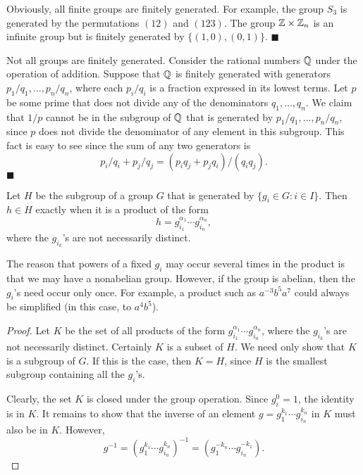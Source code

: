  
\vspace{2ex}
 
 
Obviously, all finite groups are finitely generated. For example, the
group $S_3$ is generated by the permutations $(12)$ and $(123)$. The
group ${\Bbb Z} \times {\Bbb Z}_n$ is an infinite group but is
finitely generated by $\{ (1,0), (0,1) \}$.
\hspace{\fill} $\blacksquare$
 
 
\vspace{2ex}
 
 
Not all groups are finitely generated.  Consider the rational numbers
${\Bbb Q}$ under the operation of addition. Suppose that ${\Bbb Q}$ is
finitely generated with generators $p_1/q_1, \ldots, p_n/q_n$, where
each $p_i/q_i$ is a fraction expressed in its lowest terms.  Let $p$
be some prime that does not divide any of the denominators $q_1,
\ldots, q_n$. We claim that $1/p$ cannot be in the subgroup of ${\Bbb
Q}$ that is generated by  $p_1/q_1, \ldots, p_n/q_n$, since $p$ does
not divide the denominator of any element in this subgroup. This fact
is easy to see since the sum of any two generators is
\[
p_i / q_i + p_j / q_j = (p_i q_j + p_j q_i)/(q_i q_j).
\]
\hspace{\fill} $\blacksquare$
 
 
\begin{theorem}
Let $H$ be the subgroup of a group $G$ that is generated by $\{ g_i
\in G : i \in I \}$. Then $h \in H$ exactly when it is a product of
the form 
\[
h = g_{i_1}^{\alpha_1} \cdots g_{i_n}^{\alpha_n},
\]
where the $g_{i_k}$'s are not necessarily distinct.
\end{theorem}
 
 
The reason that powers of a fixed $g_i$ may occur several times in the
product is that we may have a nonabelian group. However, if the group
is abelian, then the $g_i$'s need occur only once. For example, a
product such as $a^{-3} b^5 a^7$ could always be simplified (in this
case, to $a^4 b^5$). 
 
 
\vspace{2ex}
 
 
\begin{proof}
Let $K$ be the set of all products of the form $g_{i_1}^{\alpha_1}
\cdots g_{i_n}^{\alpha_n}$, where the $g_{i_k}$'s are not necessarily
distinct. Certainly $K$ is a subset of $H$.  We need only show that
$K$ is a subgroup of $G$. If this is the case, then $K=H$, since $H$ is
the smallest subgroup containing all the $g_i$'s.
 
 
Clearly, the set $K$ is closed under the group operation. Since $g_i^0
=1$, the identity is in $K$. It remains to show that the inverse of an
element  $g =g_1^{k_1} \cdots g_{i_n}^{k_n}$ in $K$ must also be in
$K$. However, 
\[
g^{-1}
= (g_1^{k_1} \cdots g_{i_n}^{k_n})^{-1}
= (g_1^{-k_n} \cdots g_{i_n}^{-k_1}).
\]
\end{proof}
 
